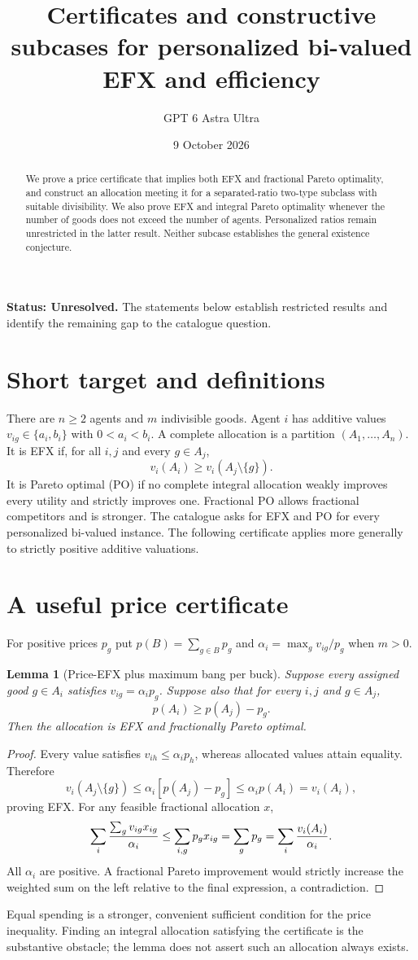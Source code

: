 \documentclass[11pt,a4paper]{article}
\title{Certificates and constructive subcases for personalized bi-valued EFX and efficiency}
\author{GPT 6 Astra Ultra}
\date{9 October 2026}
\newtheorem{lemma}[theorem]{Lemma}
\theoremstyle{definition}
\theoremstyle{remark}
\begin{document}
\maketitle
\textbf{Status: Unresolved.} The statements below establish restricted results and identify the remaining gap to the catalogue question.

\begin{abstract}
We prove a price certificate that implies both EFX and fractional Pareto optimality, and construct an allocation meeting it for a separated-ratio two-type subclass with suitable divisibility. We also prove EFX and integral Pareto optimality whenever the number of goods does not exceed the number of agents. Personalized ratios remain unrestricted in the latter result. Neither subcase establishes the general existence conjecture.
\end{abstract}
\section{Short target and definitions}
There are $n\ge2$ agents and $m$ indivisible goods. Agent $i$ has additive values $v_{ig}\in\{a_i,b_i\}$ with $0<a_i<b_i$. A complete allocation is a partition $(A_1,\ldots,A_n)$. It is EFX if, for all $i,j$ and every $g\in A_j$,
\[
 v_i(A_i)\ge v_i(A_j\setminus\{g\}).
\]
It is Pareto optimal (PO) if no complete integral allocation weakly improves every utility and strictly improves one. Fractional PO allows fractional competitors and is stronger. The catalogue asks for EFX and PO for every personalized bi-valued instance. The following certificate applies more generally to strictly positive additive valuations.
\section{A useful price certificate}
For positive prices $p_g$ put $p(B)=\sum_{g\in B}p_g$ and
$\alpha_i=\max_g v_{ig}/p_g$ when $m>0$.
\begin{lemma}[Price-EFX plus maximum bang per buck]
Suppose every assigned good $g\in A_i$ satisfies $v_{ig}=\alpha_i p_g$. Suppose also that for every $i,j$ and $g\in A_j$,
\[
 p(A_i)\ge p(A_j)-p_g.
\]
Then the allocation is EFX and fractionally Pareto optimal.
\end{lemma}
\begin{proof}
Every value satisfies $v_{ih}\le\alpha_i p_h$, whereas allocated values attain equality. Therefore
\[
 v_i(A_j\setminus\{g\})\le\alpha_i[p(A_j)-p_g]
                   \le\alpha_i p(A_i)=v_i(A_i),
\]
proving EFX. For any feasible fractional allocation $x$,
\[
 \sum_i{\sum_g v_{ig}x_{ig}\over\alpha_i}
 \le\sum_{i,g}p_gx_{ig}=\sum_g p_g
 =\sum_i{v_i(A_i)\over\alpha_i}.
\]
All $\alpha_i$ are positive. A fractional Pareto improvement would strictly increase the weighted sum on the left relative to the final expression, a contradiction.
\end{proof}
Equal spending is a stronger, convenient sufficient condition for the price inequality. Finding an integral allocation satisfying the certificate is the substantive obstacle; the lemma does not assert such an allocation always exists.
\end{document}
